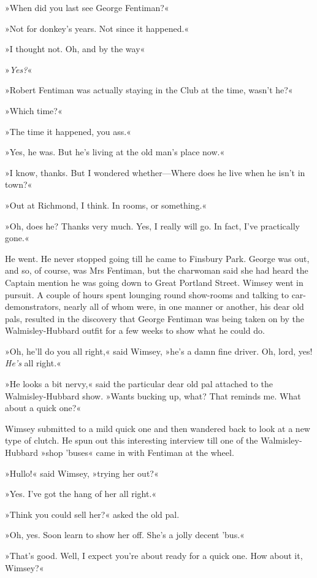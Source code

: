 »When did you last see George Fentiman?«

»Not for donkey's years. Not since it happened.«

»I thought not. Oh, and by the way\longdash«

»\textit{Yes?}«

»Robert Fentiman was actually staying in the Club at the time, wasn't he?«

»Which time?«

»The time it happened, you ass.«

»Yes, he was. But he's living at the old man's place now.«

»I know, thanks. But I wondered whether—Where does he live when he isn't in town?«

»Out at Richmond, I think. In rooms, or something.«

»Oh, does he? Thanks very much. Yes, I really will go. In fact, I've practically gone.«

He went. He never stopped going till he came to Finsbury Park. George was out, and so, of course, was Mrs Fentiman, but the charwoman said she had heard the Captain mention he was going down to Great Portland Street. Wimsey went in pursuit. A couple of hours spent lounging round show-rooms and talking to car-demonstrators, nearly all of whom were, in one manner or another, his dear old pals, resulted in the discovery that George Fentiman was being taken on by the Walmisley-Hubbard outfit for a few weeks to show what he could do.

»Oh, he'll do you all right,« said Wimsey, »he's a damn fine driver. Oh, lord, yes! \textit{He's} all right.«

»He looks a bit nervy,« said the particular dear old pal attached to the Walmisley-Hubbard show. »Wants bucking up, what? That reminds me. What about a quick one?«

Wimsey submitted to a mild quick one and then wandered back to look at a new type of clutch. He spun out this interesting interview till one of the Walmisley-Hubbard »shop 'buses« came in with Fentiman at the wheel.

»Hullo!« said Wimsey, »trying her out?«

»Yes. I've got the hang of her all right.«

»Think you could sell her?« asked the old pal.

»Oh, yes. Soon learn to show her off. She's a jolly decent 'bus.«

»That's good. Well, I expect you're about ready for a quick one. How about it, Wimsey?«

